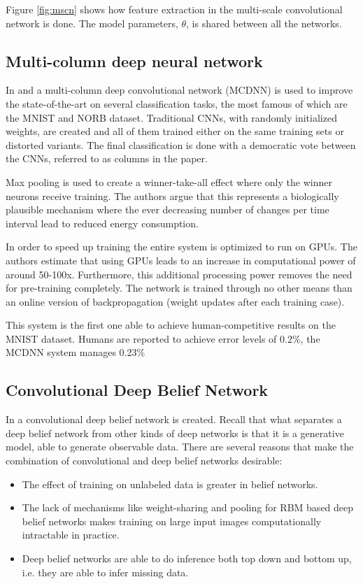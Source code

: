 \documentclass[11pt]{article}
\begin{document}
\newpage

Figure \ref{fig:mscn} shows how feature extraction in the multi-scale convolutional network is done.  The model parameters, $\theta$, is shared between all the networks.

\subsection{Multi-column deep neural network}
In \cite{ciresan} and \cite{ciresan2} a multi-column deep convolutional network (MCDNN) is used to improve the state-of-the-art on several classification tasks, the most famous of which are the MNIST and NORB dataset.  Traditional CNNs, with randomly initialized weights, are created and all of them trained either on the same training sets or distorted variants.  The final classification is done with a democratic vote between the CNNs, referred to as columns in the paper.

Max pooling is used to create a winner-take-all effect where only the winner neurons receive training.  The authors argue that this represents a biologically plausible mechanism where the ever decreasing number of changes per time interval lead to reduced energy consumption.

In order to speed up training the entire system is optimized to run on GPUs. The authors estimate that using GPUs leads to an increase in computational power of around 50-100x.  Furthermore, this additional processing power removes the need for pre-training completely.  The network is trained through no other means than an online version of backpropagation (weight updates after each training case).

This system is the first one able to achieve human-competitive results on the MNIST dataset.  Humans are reported to achieve error levels of 0.2\%, the MCDNN system manages 0.23\%


\subsection{Convolutional Deep Belief Network}

In \cite{lee} a convolutional deep belief network is created.  Recall that what separates a deep belief network from other kinds of deep networks is that it is a generative model, able to generate observable data.  There are several reasons that make the combination of convolutional and deep belief networks desirable:
\begin{itemize}
 \item The effect of training on unlabeled data is greater in belief networks.
 \item The lack of mechanisms like weight-sharing and pooling for RBM based deep belief networks makes training on large input images computationally intractable in practice.
 \item Deep belief networks are able to do inference both top down and bottom up, i.e. they are able to infer missing data.
\end{itemize}
\end{document}
